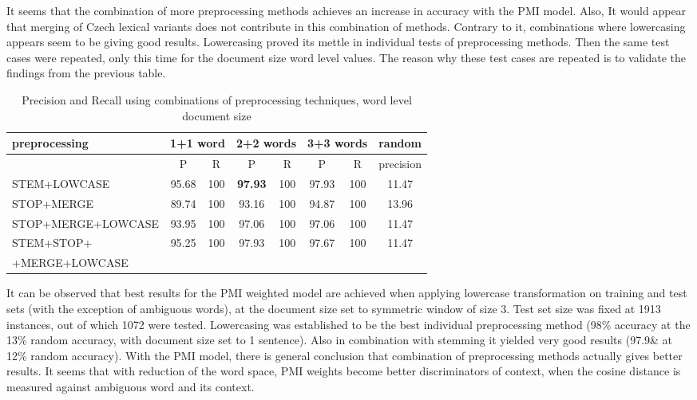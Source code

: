 It seems that the combination of more preprocessing methods achieves an increase in accuracy with the PMI model. Also, It would appear that merging of Czech lexical variants does not contribute in this combination of 
methods. Contrary to it, combinations where lowercasing appears seem to be giving good results. Lowercasing proved its mettle in individual tests of preprocessing methods. Then the same test cases were repeated, only this time for the document size word level values. The reason why 
these test cases are repeated is to validate the findings from the previous table. 

 \begin{table}[h!]
\begin{small}
\begin{tabular}{ l | c c | c c | c c | c}
preprocessing & \multicolumn{2}{l|}{1+1 word} & \multicolumn{2}{l|}{2+2 words} & \multicolumn{2}{l|}{3+3 words} & random\\
\hline
	& P  &  R & P  &  R & P  &  R & precision\\
\hline\hline
STEM+LOWCASE  & 95.68 & 100 & \textbf{97.93} & 100 & 97.93 & 100 & 11.47\\
STOP+MERGE  & 89.74 & 100 & 93.16 & 100 & 94.87 & 100 & 13.96 \\
STOP+MERGE+LOWCASE  & 93.95 & 100 & 97.06 & 100 & 97.06 & 100 & 11.47\\
STEM+STOP+ & 95.25 & 100 & 97.93 & 100 & 97.67 & 100 & 11.47 \\
+MERGE+LOWCASE  &&&&&&&\\
\end{tabular}
\caption{Precision and Recall using combinations of preprocessing techniques, word level document size}
\end{small}
\end{table}


It can be observed that best results for the PMI weighted model are achieved when applying lowercase 
transformation on training and test sets (with the exception of ambiguous words), at the document size set to 
symmetric window of size 3. Test set size was fixed at 1913 instances, out of which 1072 were tested. 
Lowercasing was established to be the best individual preprocessing method (98\% accuracy at the 13\% random 
accuracy, with document size set to 1 sentence). Also in combination with stemming it yielded very good results 
(97.9\& at 12\% random accuracy). With the PMI model, there is general conclusion that combination of 
preprocessing methods actually gives better results. It seems that with reduction of the word space, PMI weights 
become better discriminators of context, when the cosine distance is measured against ambiguous word and its 
context.  

